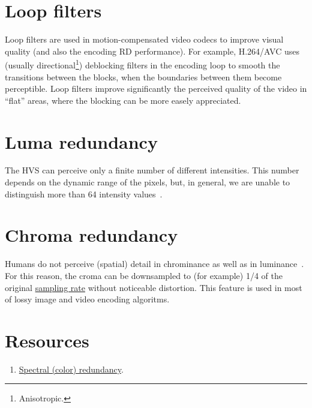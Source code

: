 \section{Loop filters}

Loop filters are used in motion-compensated video codecs to improve
visual quality (and also the encoding RD performance). For example,
H.264/AVC uses (usually directional\footnote{Anisotropic.})
deblocking filters in the encoding loop to smooth the transitions
between the blocks, when the boundaries between them become
perceptible. Loop filters improve significantly the perceived quality
of the video in ``flat'' areas, where the blocking can be more easely
appreciated.

\section{Luma redundancy}

The HVS can perceive only a finite number of different
intensities. This number depends on the dynamic range of the pixels,
but, in general, we are unable to distinguish more than 64 intensity
values~\cite{vruiz__visual_redundancy}.

\section{Chroma redundancy}

Humans do not perceive (spatial) detail in chrominance as well as in
luminance~\cite{burger2016digital}. For this reason, the croma can be
downsampled to (for example) 1/4 of the original
\href{https://en.wikipedia.org/wiki/Sampling_(signal_processing)}{sampling
  rate} without noticeable distortion. This feature is used in most of
lossy image and video encoding algoritms.

\section{Resources}
\begin{enumerate}
\item \href{https://github.com/vicente-gonzalez-ruiz/color_transforms/blob/main/docs/color_redundancy.ipynb}{Spectral
    (color) redundancy}.
\end{enumerate}

